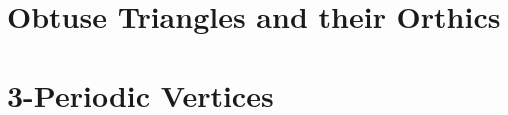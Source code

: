 %

\section{Obtuse Triangles and their Orthics}
\label{app:orthic-incenter}


\section{3-Periodic Vertices}
\label{app:vertices}


%



